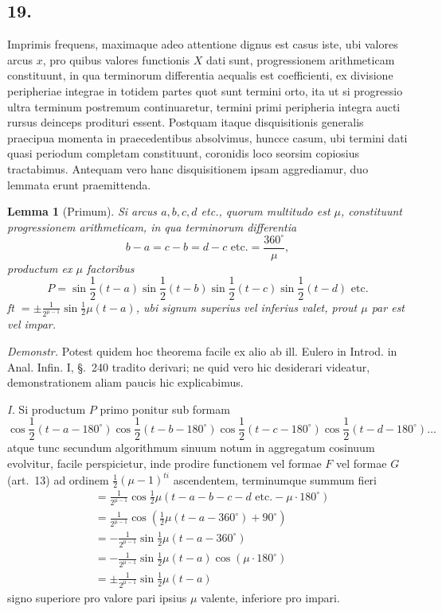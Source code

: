 \documentclass[12pt,a4paper]{article}
\theoremstyle{plain}
\newtheorem*{lemma}{Lemma}
\begin{document}
\subsection*{19.}

Imprimis frequens, maximaque adeo attentione dignus est casus iste, ubi valores arcus $x$, pro quibus valores functionis $X$ dati sunt, progressionem arithmeticam
constituunt, in qua terminorum differentia aequalis est coefficienti, ex divisione peripheriae integrae in totidem partes quot sunt termini orto, ita ut si progressio
ultra terminum postremum continuaretur, termini primi peripheria integra aucti rursus deinceps prodituri essent. Postquam itaque disquisitionis generalis praecipua momenta
in praecedentibus absolvimus, huncce casum, ubi termini dati quasi periodum completam constituunt, coronidis loco seorsim copiosius tractabimus. Antequam vero hanc
disquisitionem ipsam aggrediamur, duo lemmata erunt praemittenda.

\begin{lemma}[Primum] Si arcus $a, b, c, d$ etc., quorum multitudo est $\mu$, constituunt progressionem
arithmeticam, in qua terminorum differentia
\[
b-a = c-b = d-c\text{ etc.} = \frac{360^{\circ}}{\mu},
\]
productum ex $\mu$ factoribus
\[
P = \sin\frac{1}{2}(t-a)\sin\frac{1}{2}(t-b)\sin\frac{1}{2}(t-c)\sin\frac{1}{2}(t-d)\text{ etc.}
\]
ft $= \pm\frac{1}{2^{\mu-1}}\sin\frac{1}{2}\mu(t-a)$, ubi signum superius vel inferius valet, prout $\mu$ par est vel impar.
\end{lemma}

\textit{Demonstr.} Potest quidem hoc theorema facile ex alio ab ill. Eulero in Introd. in Anal. Infin. I, \S.\ 240 tradito derivari; ne quid vero hic desiderari
videatur, demonstrationem aliam paucis hic explicabimus.

\textit{I.} Si productum $P$ primo ponitur sub formam
\[
\cos\frac{1}{2}(t-a-180^{\circ})\cos\frac{1}{2}(t-b-180^{\circ})\cos\frac{1}{2}(t-c-180^{\circ})\cos\frac{1}{2}(t-d-180^{\circ})\ldots
\]
atque tunc secundum algorithmum sinuum notum in aggregatum cosinuum evolvitur, facile perspicietur, inde prodire functionem vel formae $F$ vel formae $G$ (art.\ 13)
ad ordinem $\frac{1}{2}(\mu-1)^{ti}$ ascendentem, terminumque summum fieri
\begin{align*} &= \frac{1}{2^{\mu-1}}\cos\frac{1}{2}\mu(t-a-b-c-d\text{ etc.} - \mu\cdot 180^{\circ})\\
&= \frac{1}{2^{\mu-1}}\cos(\frac{1}{2}\mu(t-a-360^{\circ}) + 90^{\circ})\\
&= -\frac{1}{2^{\mu-1}}\sin\frac{1}{2}\mu(t-a-360^{\circ})\\
&= -\frac{1}{2^{\mu-1}}\sin\frac{1}{2}\mu(t-a)\cos(\mu\cdot 180^{\circ})\\
&= \pm\frac{1}{2^{\mu-1}}\sin\frac{1}{2}\mu(t-a)
\end{align*}
signo superiore pro valore pari ipsius $\mu$ valente, inferiore pro impari.
\end{document}
